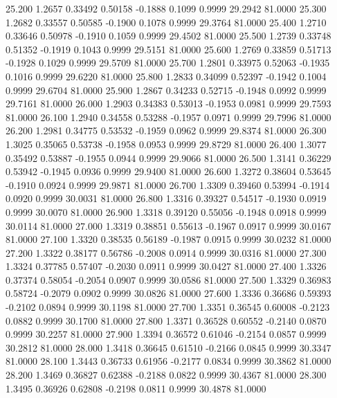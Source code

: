   25.200   1.2657   0.33492   0.50158  -0.1888   0.1099   0.9999  29.2942  81.0000
  25.300   1.2682   0.33557   0.50585  -0.1900   0.1078   0.9999  29.3764  81.0000
  25.400   1.2710   0.33646   0.50978  -0.1910   0.1059   0.9999  29.4502  81.0000
  25.500   1.2739   0.33748   0.51352  -0.1919   0.1043   0.9999  29.5151  81.0000
  25.600   1.2769   0.33859   0.51713  -0.1928   0.1029   0.9999  29.5709  81.0000
  25.700   1.2801   0.33975   0.52063  -0.1935   0.1016   0.9999  29.6220  81.0000
  25.800   1.2833   0.34099   0.52397  -0.1942   0.1004   0.9999  29.6704  81.0000
  25.900   1.2867   0.34233   0.52715  -0.1948   0.0992   0.9999  29.7161  81.0000
  26.000   1.2903   0.34383   0.53013  -0.1953   0.0981   0.9999  29.7593  81.0000
  26.100   1.2940   0.34558   0.53288  -0.1957   0.0971   0.9999  29.7996  81.0000
  26.200   1.2981   0.34775   0.53532  -0.1959   0.0962   0.9999  29.8374  81.0000
  26.300   1.3025   0.35065   0.53738  -0.1958   0.0953   0.9999  29.8729  81.0000
  26.400   1.3077   0.35492   0.53887  -0.1955   0.0944   0.9999  29.9066  81.0000
  26.500   1.3141   0.36229   0.53942  -0.1945   0.0936   0.9999  29.9400  81.0000
  26.600   1.3272   0.38604   0.53645  -0.1910   0.0924   0.9999  29.9871  81.0000
  26.700   1.3309   0.39460   0.53994  -0.1914   0.0920   0.9999  30.0031  81.0000
  26.800   1.3316   0.39327   0.54517  -0.1930   0.0919   0.9999  30.0070  81.0000
  26.900   1.3318   0.39120   0.55056  -0.1948   0.0918   0.9999  30.0114  81.0000
  27.000   1.3319   0.38851   0.55613  -0.1967   0.0917   0.9999  30.0167  81.0000
  27.100   1.3320   0.38535   0.56189  -0.1987   0.0915   0.9999  30.0232  81.0000
  27.200   1.3322   0.38177   0.56786  -0.2008   0.0914   0.9999  30.0316  81.0000
  27.300   1.3324   0.37785   0.57407  -0.2030   0.0911   0.9999  30.0427  81.0000
  27.400   1.3326   0.37374   0.58054  -0.2054   0.0907   0.9999  30.0586  81.0000
  27.500   1.3329   0.36983   0.58724  -0.2079   0.0902   0.9999  30.0826  81.0000
  27.600   1.3336   0.36686   0.59393  -0.2102   0.0894   0.9999  30.1198  81.0000
  27.700   1.3351   0.36545   0.60008  -0.2123   0.0882   0.9999  30.1700  81.0000
  27.800   1.3371   0.36528   0.60552  -0.2140   0.0870   0.9999  30.2257  81.0000
  27.900   1.3394   0.36572   0.61046  -0.2154   0.0857   0.9999  30.2812  81.0000
  28.000   1.3418   0.36645   0.61510  -0.2166   0.0845   0.9999  30.3347  81.0000
  28.100   1.3443   0.36733   0.61956  -0.2177   0.0834   0.9999  30.3862  81.0000
  28.200   1.3469   0.36827   0.62388  -0.2188   0.0822   0.9999  30.4367  81.0000
  28.300   1.3495   0.36926   0.62808  -0.2198   0.0811   0.9999  30.4878  81.0000
